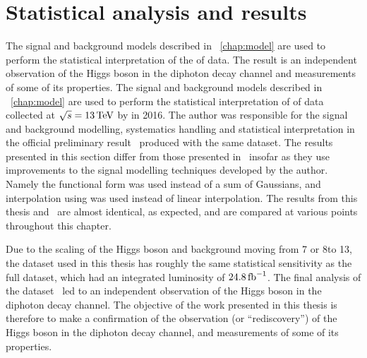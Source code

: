 \chapter{Statistical analysis and results}
\label{chap:statandresults}

\ifNewAnalysis
The signal and background models described in \Chapter~\ref{chap:model} are used to perform the statistical interpretation of the \thisanalysislumi\ifb of data. The result is an independent observation of the Higgs boson in the diphoton decay channel and measurements of some of its properties. %
\else
The signal and background models described in \Chapter~\ref{chap:model} are used to perform the statistical interpretation of \thisanalysislumi\ifb of \RunII data collected at $\sqrt{s}=13\,\text{Te\hspace{-.08em}V}$ by \CMS in 2016. The author was responsible for the signal and background modelling, systematics handling and statistical interpretation in the official \CMS preliminary result~\cite{CMS-PAS-HIG-16-020} produced with the same dataset. The results presented in this section differ from those presented in~\cite{CMS-PAS-HIG-16-020} insofar as they use improvements to the signal modelling techniques developed by the author. Namely the \DCBpG functional form was used instead of a sum of Gaussians, and interpolation using \SSF was used instead of linear interpolation. The results from this thesis and~\cite{CMS-PAS-HIG-16-020} are almost identical, as expected, and are compared at various points throughout this chapter.

Due to the scaling of the \SM Higgs boson and background \crosssection\s moving from 7 or 8\TeV to 13\TeV, the dataset used in this thesis has roughly the same statistical sensitivity as the full \RunI dataset, which had an integrated luminosity of $24.8\,\text{fb}^{-1}$. The final analysis of the \RunI dataset~\cite{LegacyHgg} led to an independent observation of the Higgs boson in the diphoton decay channel. The objective of the work presented in this thesis is therefore to make a confirmation of the observation (or ``rediscovery'') of the Higgs boson in the diphoton decay channel, and measurements of some of its properties.
\fi

